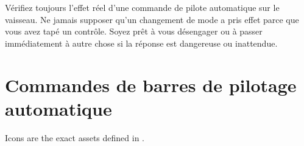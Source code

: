 \begin{warningbox}
Vérifiez toujours l'effet réel d'une commande de pilote automatique sur le vaisseau.
Ne jamais supposer qu'un changement de mode a pris effet parce que vous avez tapé un contrôle.
Soyez prêt à vous désengager ou à passer immédiatement à autre chose si la réponse est dangereuse ou
inattendue.
\end{warningbox}


\section{Commandes de barres de pilotage automatique}

Icons are the exact assets defined in .

